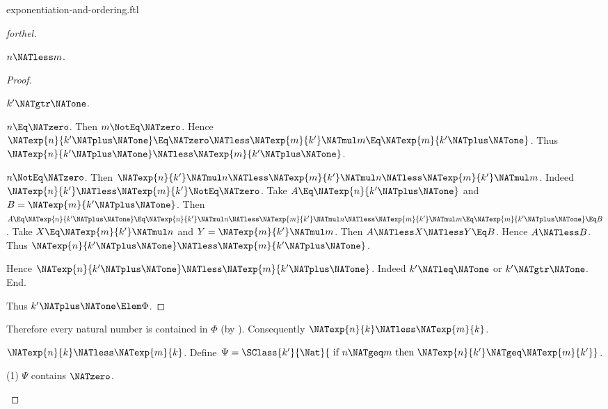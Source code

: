 \documentclass{stex}
\begin{document}
\begin{smodule}{exponentiation-and-ordering.ftl}
\begin{proof}[forthel]
\begin{case}{$n \NATless m$.}
\begin{proof}
        \begin{case}{$k' \NATgtr \NATone$.}
          \begin{case}{$n \Eq \NATzero$.}
            Then $m \NotEq \NATzero$.
            Hence $\NATexp{n}{k' \NATplus \NATone}
              \Eq \NATzero
              \NATless \NATexp{m}{k'} \NATmul m
              \Eq \NATexp{m}{k' \NATplus \NATone}$.
            Thus $\NATexp{n}{k' \NATplus \NATone} \NATless \NATexp{m}{k' \NATplus \NATone}$.
          \end{case}

          \begin{case}{$n \NotEq \NATzero$.}
            Then $\NATexp{n}{k'} \NATmul n
              \NATless \NATexp{m}{k'} \NATmul n
              \NATless \NATexp{m}{k'} \NATmul m$.
            Indeed $\NATexp{n}{k'} \NATless \NATexp{m}{k'} \NotEq \NATzero$.
            Take $A \Eq \NATexp{n}{k' \NATplus \NATone}$ and $B = \NATexp{m}{k' \NATplus \NATone}$. %
            Then $A
              \Eq \NATexp{n}{k' \NATplus \NATone}
              \Eq \NATexp{n}{k'} \NATmul n
              \NATless \NATexp{m}{k'} \NATmul n
              \NATless \NATexp{m}{k'} \NATmul m
              \Eq \NATexp{m}{k' \NATplus \NATone}
              \Eq B$.
            Take $X \Eq \NATexp{m}{k'} \NATmul n$ and $Y = \NATexp{m}{k'} \NATmul m$.
            Then $A \NATless X \NATless Y \Eq B$.
            Hence $A \NATless B$.
            Thus $\NATexp{n}{k' \NATplus \NATone} \NATless \NATexp{m}{k' \NATplus \NATone}$.
          \end{case}
        \end{case}

        Hence $\NATexp{n}{k' \NATplus \NATone} \NATless \NATexp{m}{k' \NATplus \NATone}$.
        Indeed $k' \NATleq \NATone$ or $k' \NATgtr \NATone$.
      End.

      Thus $k' \NATplus \NATone \Elem \Phi$.
    \end{proof}

    Therefore every natural number is contained in $\Phi$ (by ).
    Consequently $\NATexp{n}{k} \NATless \NATexp{m}{k}$.
  \end{case}

  \begin{case}{$\NATexp{n}{k} \NATless \NATexp{m}{k}$.}
    Define $\Psi = \SClass{k'}{\Nat}{\text{ if }n \NATgeq m\text{ then }\NATexp{n}{k'} \NATgeq \NATexp{m}{k'}}$.

    (1) $\Psi$ contains $\NATzero$.


\end{case}
\end{proof}
\end{smodule}
\end{document}
